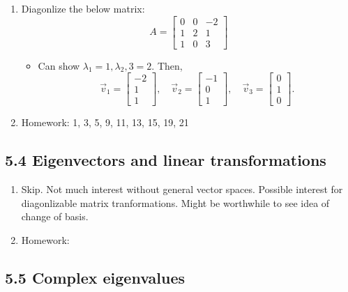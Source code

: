\documentclass{article}
\begin{document}
\begin{enumerate}
\item Diagonlize the below matrix:
\[
A = \left[
\begin{array}{ccc}
0 & 0 & -2 \\
1 & 2 & 1 \\
1 & 0 & 3
\end{array}
\right]
\]
\begin{itemize}
\item Can show $\lambda_1=1, \lambda_2,3 = 2$. Then,
\[
\vec{v}_1 = \left[
\begin{array}{c}
-2 \\ 1 \\ 1
\end{array}
\right], \quad
\vec{v}_2 = \left[
\begin{array}{c}
-1 \\ 0 \\ 1
\end{array}
\right], \quad
\vec{v}_3 = \left[
\begin{array}{c}
0 \\ 1 \\ 0
\end{array}
\right].
\]
\end{itemize}

\item Homework: 1, 3, 5, 9, 11, 13, 15, 19, 21

\end{enumerate}

\subsection{5.4 Eigenvectors and linear transformations}

\begin{enumerate}

\item Skip. Not much interest without general vector spaces. Possible interest for diagonlizable matrix tranformations. Might be worthwhile to see idea of change of basis.

\item Homework: 

\end{enumerate}

\subsection{5.5 Complex eigenvalues}
\end{document}
